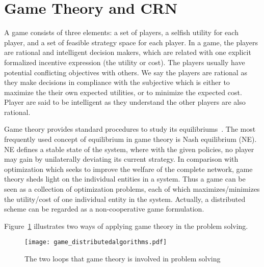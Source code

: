 




\section{Game Theory and CRN}
\label{gametheory_crn}
A game consists of three elements: a set of players, a selfish utility for each player, and a set of feasible strategy space for each player.
In a game, the players are rational and intelligent decision makers, which are related with one explicit formalized incentive expression (the utility or cost).
The players usually have potential conflicting objectives with others.
We say the players are rational as they make decisions in compliance with the subjective which is either to maximize the their own expected utilities, or to minimize the expected cost.
Player are said to be intelligent as they understand the other players are also rational.
%

Game theory provides standard procedures to study its equilibriums~\cite{game_for_communication_01}.
The most frequently used concept of equilibrium in game theory is Nash equilibrium (\gls{NE}).
NE defines a stable state of the system, where with the given policies, no player may gain by unilaterally deviating its current strategy.
In comparison with optimization which seeks to improve the welfare of the complete network, game theory sheds light on the individual entities in a system.
Thus a game can be seen as a collection of optimization problems, each of which maximizes/minimizes the utility/cost of one individual entity in the system.
Actually, a distributed scheme can be regarded as a non-cooperative game formulation. 


Figure~\ref{game_distributedalgorithms} illustrates two ways of applying game theory in the problem solving.
\begin{figure}[h!]
  \centering
  \texttt{[image: game\_distributedalgorithms.pdf]}
  \caption{The two loops that game theory is involved in problem solving}
\label{game_distributedalgorithms}
\end{figure}


